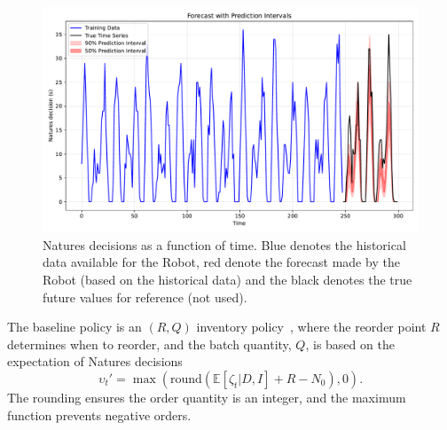 \begin{figure}[h!]
	\centering
	\includegraphics[width=1\textwidth]{figures/time_series.pdf}
	\caption{Natures decisions as a function of time. Blue denotes the historical data available for the Robot, red denote the forecast made by the Robot (based on the historical data) and the black denotes the true future values for reference (not used).}
	\label{fig:ts}
\end{figure}
\begin{definition}  
	\label{def:baseline}
	The baseline policy is an $(R, Q)$ inventory policy~\citep{bartmann1992inventory,axsaeter2006inventory}, where the reorder point $R$ determines when to reorder, and the batch quantity, $Q$, is based on the expectation of Natures decisions
	\begin{equation}  
		\upsilon_t' = \max(\text{round}(\mathbb{E}[\zeta_t|D, I] + R - N_0), 0).  
	\end{equation}  
	The rounding ensures the order quantity is an integer, and the maximum function prevents negative orders.
\end{definition}

